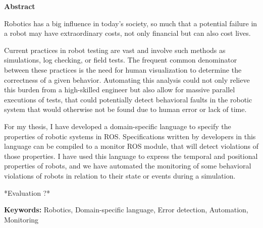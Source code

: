 \vspace*{2cm}
\begin{center}
\Large \bf Abstract
\end{center}
\vspace*{1cm} \setlength{\baselineskip}{0.6cm}

Robotics has a big influence in today's society, so much that a potential failure in a robot may have extraordinary costs, not only financial but can also cost lives.

Current practices in robot testing are vast and involve such methods as simulations, log checking, or field tests. The frequent common denominator between these practices is the need for human visualization to determine the correctness of a given behavior. Automating this analysis could not only relieve this burden from a high-skilled engineer but also allow for massive parallel executions of tests, that could potentially detect behavioral faults in the robotic system that would otherwise not be found due to human error or lack of time.

For my thesis, I have developed a domain-specific language to specify the properties of robotic systems in ROS. Specifications written by developers in this language can be compiled to a monitor ROS module, that will detect violations of those properties. I have used this language to express the temporal and positional properties of robots, and we have automated the monitoring of some behavioral violations of robots in relation to their state or events during a simulation.

*Evaluation ?*

\vfill

\begin{flushleft}
\textbf{Keywords:}
Robotics, Domain-specific language, Error detection, Automation, Monitoring
\end{flushleft}
